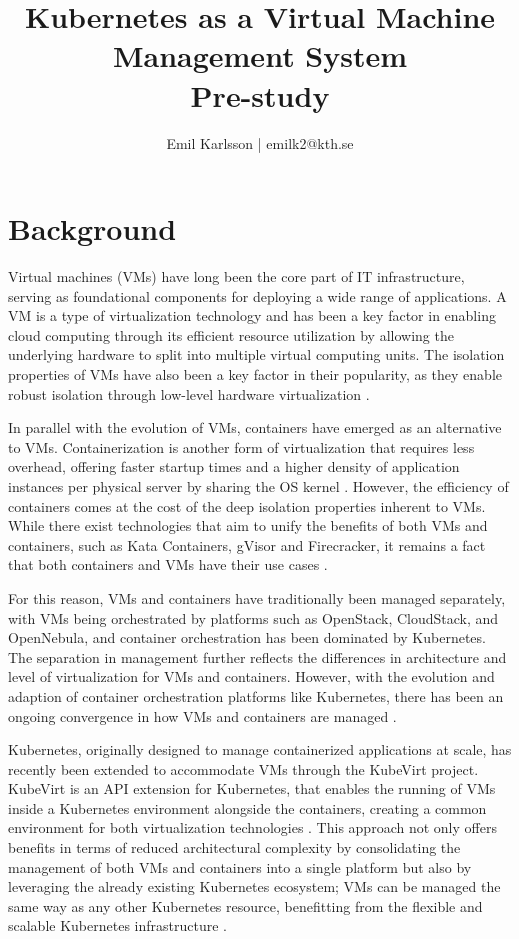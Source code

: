 \documentclass{article}
\title{%
    Kubernetes as a Virtual Machine Management System \\
    \large Pre-study \\
}
\author{Emil Karlsson | emilk2@kth.se}
\begin{document}
\maketitle
\section{Background}
Virtual machines (VMs) have long been the core part of IT infrastructure, serving as foundational components for deploying a wide range of applications. A VM is a type of virtualization technology and has been a key factor in enabling cloud computing through its efficient resource utilization by allowing the underlying hardware to split into multiple virtual computing units. The isolation properties of VMs have also been a key factor in their popularity, as they enable robust isolation through low-level hardware virtualization \cite{virtualization-basics}.

In parallel with the evolution of VMs, containers have emerged as an alternative to VMs. Containerization is another form of virtualization that requires less overhead, offering faster startup times and a higher density of application instances per physical server by sharing the OS kernel \cite{container-vm-overview}. However, the efficiency of containers comes at the cost of the deep isolation properties inherent to VMs. While there exist technologies that aim to unify the benefits of both VMs and containers, such as Kata Containers, gVisor and Firecracker, it remains a fact that both containers and VMs have their use cases \cite{container-runtimes-overview}\cite{container-as-vm-comparison}. 

For this reason, VMs and containers have traditionally been managed separately, with VMs being orchestrated by platforms such as OpenStack, CloudStack, and OpenNebula, and container orchestration has been dominated by Kubernetes. The separation in management further reflects the differences in architecture and level of virtualization for VMs and containers. However, with the evolution and adaption of container orchestration platforms like Kubernetes, there has been an ongoing convergence in how VMs and containers are managed \cite{Li2023}. 

Kubernetes, originally designed to manage containerized applications at scale, has recently been extended to accommodate VMs through the KubeVirt project. KubeVirt is an API extension for Kubernetes, that enables the running of VMs inside a Kubernetes environment alongside the containers, creating a common environment for both virtualization technologies \cite{kubevirt}. This approach not only offers benefits in terms of reduced architectural complexity by consolidating the management of both VMs and containers into a single platform but also by leveraging the already existing Kubernetes ecosystem; VMs can be managed the same way as any other Kubernetes resource, benefitting from the flexible and scalable Kubernetes infrastructure \cite{kubevirt-cncf}.
\end{document}
